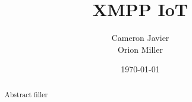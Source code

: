 \documentclass{sig-alternate}
\begin{document}
\title{XMPP IoT}
\author{Cameron Javier\\
        Orion Miller}
\date{\today}
\maketitle

\begin{abstract}
Abstract filler
\end{abstract}
\end{document}
